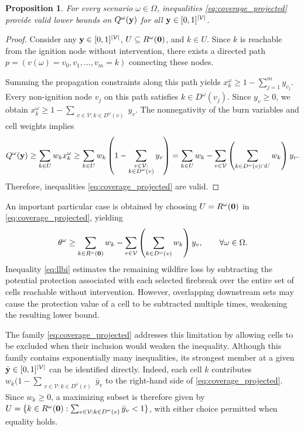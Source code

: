 \documentclass[a4paper,fleqn]{cas-sc}
\newtheorem{proposition}{Proposition}
\begin{document}
\begin{proposition}
\label{prop:coverage_validity}
For every scenario $\omega \in \Omega$, inequalities
\eqref{eq:coverage_projected} provide valid lower bounds
on $Q^\omega(\vb{y})$ for all
$\vb{y} \in [0,1]^{|\mathcal{V}|}$.
\end{proposition}

\begin{proof}
Consider any $\vb{y} \in [0,1]^{|\mathcal{V}|}$,
$U \subseteq R^\omega(\vb{0})$, and $k \in U$.
Since $k$ is reachable from the ignition node without
intervention, there exists a directed path
$p=(v(\omega)=v_0,v_1,\ldots,v_m=k)$ connecting these
nodes.

Summing the propagation constraints along this path yields  $x_k^\omega \geq
1-\sum_{j=1}^{m}y_{v_j}$. Every non-ignition node $v_j$ on this path satisfies
$k \in D^\omega(v_j)$. Since $y_v \geq 0$, we obtain $x_k^\omega \geq
1-\sum_{\substack{v \in \mathcal{V}: k \in D^\omega(v)}}y_v$. The nonnegativity of the burn variables and cell weights implies
%
\begin{align*}
Q^\omega(\vb{y})
\geq
\sum_{k \in U}w_k x_k^\omega
\nonumber
\geq
\sum_{k \in U}w_k
\left(
1-
\sum_{\substack{v \in \mathcal{V}:\\
k \in D^\omega(v)}}y_v
\right)
\nonumber
=
\sum_{k \in U}w_k
-
\sum_{v \in \mathcal{V}}
\left(
\sum_{k \in D^\omega(v)\cap U}w_k
\right)y_v.
\end{align*}
%
Therefore, inequalities \eqref{eq:coverage_projected}
are valid.
\end{proof}

An important particular case is obtained by choosing $U=R^\omega(\vb{0})$ in \eqref{eq:coverage_projected}, yielding
%
\begin{equation}
\label{eq:llbi}
\theta^\omega \geq
\sum_{k \in R^\omega(\vb{0})} w_k
-
\sum_{v \in \mathcal{V}}
\left(
\sum_{k \in D^\omega(v)} w_k
\right)y_v,
\qquad \forall \omega \in \Omega.
\end{equation}
%
Inequality \eqref{eq:llbi} estimates the remaining wildfire loss by subtracting the potential protection associated with each selected firebreak over the entire set of cells reachable without intervention. However, overlapping downstream sets may cause the protection value of a cell to be subtracted multiple times, weakening the resulting lower bound.

The family \eqref{eq:coverage_projected} addresses this limitation by allowing cells to be excluded when their inclusion would weaken the inequality. Although this family contains exponentially many inequalities, its strongest member at a given $\bar{\vb{y}} \in [0,1]^{|\mathcal{V}|}$ can be identified directly. Indeed, each cell $k$ contributes $w_k(1- \sum_{\substack{v \in \mathcal{V}: k \in D^\omega(v)}}\bar{y}_v$ to the right-hand side of \eqref{eq:coverage_projected}. Since $w_k \geq 0$, a maximizing subset is therefore given by  $U = \{
k \in R^\omega(\vb{0}) :
\sum_{\substack{v \in \mathcal{V}: k \in D^\omega(v)}}\bar{y}_v < 1
\}$, with either choice permitted when equality holds.
\end{document}
